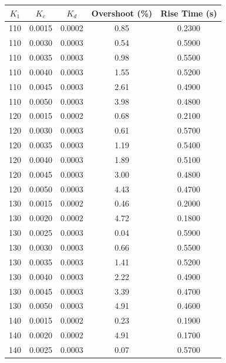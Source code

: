 \documentclass[12pt]{report}
\begin{document}
\begin{table}[H]
    \centering
    \begin{tabular}{|c|c|c|c|c|}
    \hline
    {$K_1$} & {$K_e$} & {$K_d$} & {Overshoot (\%)} & {Rise Time (s)} \\
    \hline
    110     & 0.0015  & 0.0002  &  0.85            & 0.2300 \\
    110     & 0.0030  & 0.0003  &  0.54            & 0.5900 \\
    110     & 0.0035  & 0.0003  &  0.98            & 0.5500 \\
    110     & 0.0040  & 0.0003  &  1.55            & 0.5200 \\
    110     & 0.0045  & 0.0003  &  2.61            & 0.4900 \\
    110     & 0.0050  & 0.0003  &  3.98            & 0.4800 \\
    120     & 0.0015  & 0.0002  &  0.68            & 0.2100 \\
    120     & 0.0030  & 0.0003  &  0.61            & 0.5700 \\
    120     & 0.0035  & 0.0003  &  1.19            & 0.5400 \\
    120     & 0.0040  & 0.0003  &  1.89            & 0.5100 \\
    120     & 0.0045  & 0.0003  &  3.00            & 0.4800 \\
    120     & 0.0050  & 0.0003  &  4.43            & 0.4700 \\
    130     & 0.0015  & 0.0002  &  0.46            & 0.2000 \\
    130     & 0.0020  & 0.0002  &  4.72            & 0.1800 \\
    130     & 0.0025  & 0.0003  &  0.04            & 0.5900 \\
    130     & 0.0030  & 0.0003  &  0.66            & 0.5500 \\
    130     & 0.0035  & 0.0003  &  1.41            & 0.5200 \\
    130     & 0.0040  & 0.0003  &  2.22            & 0.4900 \\
    130     & 0.0045  & 0.0003  &  3.39            & 0.4700 \\
    130     & 0.0050  & 0.0003  &  4.91            & 0.4600 \\
    140     & 0.0015  & 0.0002  &  0.23            & 0.1900 \\
    140     & 0.0020  & 0.0002  &  4.91            & 0.1700 \\
    140     & 0.0025  & 0.0003  &  0.07            & 0.5700 \\

\end{tabular}
\end{table}
\end{document}
